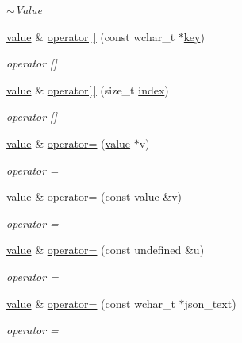 \begin{DoxyCompactItemize}
\begin{DoxyCompactList}\small\item\em $\sim$\+Value \end{DoxyCompactList}\item 
\hyperlink{classformat_1_1value}{value} \& \hyperlink{classformat_1_1value_a59a729393bc6137e6782ea96f89bf18a}{operator\mbox{[}$\,$\mbox{]}} (const wchar\+\_\+t $\ast$\hyperlink{classformat_1_1value_ad4865e7984fc9f3b5ce7c17fd7ac740c}{key})
\begin{DoxyCompactList}\small\item\em operator \mbox{[}\mbox{]} \end{DoxyCompactList}\item 
\hyperlink{classformat_1_1value}{value} \& \hyperlink{classformat_1_1value_a68e009d6421f7a127978e9b48adcf200}{operator\mbox{[}$\,$\mbox{]}} (size\+\_\+t \hyperlink{classformat_1_1value_aaa429b28cc0edf5a3589b89a1820ad62}{index})
\begin{DoxyCompactList}\small\item\em operator \mbox{[}\mbox{]} \end{DoxyCompactList}\item 
\hyperlink{classformat_1_1value}{value} \& \hyperlink{classformat_1_1value_aae4cf62ca68a4df00a31a66c1c576c3e}{operator=} (\hyperlink{classformat_1_1value}{value} $\ast$v)
\begin{DoxyCompactList}\small\item\em operator = \end{DoxyCompactList}\item 
\hyperlink{classformat_1_1value}{value} \& \hyperlink{classformat_1_1value_a711e2949ae310096a9e429c52574fffc}{operator=} (const \hyperlink{classformat_1_1value}{value} \&v)
\begin{DoxyCompactList}\small\item\em operator = \end{DoxyCompactList}\item 
\hyperlink{classformat_1_1value}{value} \& \hyperlink{classformat_1_1value_a126201c87fd63a093fecc2e16735ac52}{operator=} (const undefined \&u)
\begin{DoxyCompactList}\small\item\em operator = \end{DoxyCompactList}\item 
\hyperlink{classformat_1_1value}{value} \& \hyperlink{classformat_1_1value_a0a17ba9f3d99be0c1d86d91adac0bb60}{operator=} (const wchar\+\_\+t $\ast$json\+\_\+text)
\begin{DoxyCompactList}\small\item\em operator = \end{DoxyCompactList}\item 

\end{DoxyCompactItemize}

